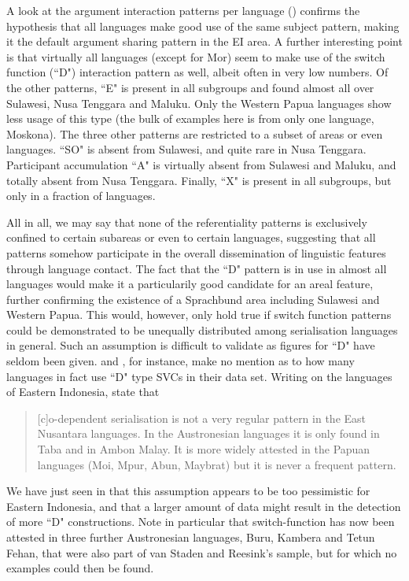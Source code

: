 A look at the argument interaction patterns per language () confirms the hypothesis that all languages make good use of the same subject pattern, making it the default argument sharing pattern in the EI area. A further interesting point is that virtually all languages (except for Mor) seem to make use of the switch function (``D") interaction pattern as well, albeit often in very low numbers. Of the other patterns, ``E" is present in all subgroups and found almost all over Sulawesi, Nusa Tenggara and Maluku. Only the Western Papua languages show less usage of this type (the bulk of examples here is from only one language, Moskona). The three other patterns are restricted to a subset of areas or even languages. ``SO" is absent from Sulawesi, and quite rare in Nusa Tenggara. Participant accumulation ``A" is virtually absent from Sulawesi and Maluku, and totally absent from Nusa Tenggara. Finally, ``X" is present in all subgroups, but only in a fraction of languages.

All in all, we may say that none of the referentiality patterns is exclusively confined to certain subareas or even to certain languages, suggesting that all patterns somehow participate in the overall dissemination of linguistic features through language contact. The fact that the ``D" pattern is in use in almost all languages would make it a particularily good candidate for an areal feature, further confirming the existence of a Sprachbund area including Sulawesi and Western Papua. This would, however, only hold true if switch function patterns could be demonstrated to be unequally distributed among serialisation languages in general. Such an assumption is difficult to validate as figures for ``D" have seldom been given. \textcite{Aikhenvald2006} and \textcite{Durie1997}, for instance, make no mention as to how many languages in fact use ``D" type SVCs in their data set. Writing on the languages of Eastern Indonesia, \citet[26]{vanstaden2008serial} state that \begin{quote}[c]o-dependent serialisation is not a very regular pattern in the East Nusantara languages. In the Austronesian languages it is only found in Taba and in Ambon Malay. It is more widely attested in the Papuan languages (Moi, Mpur, Abun, Maybrat) but it is never a frequent pattern.\end{quote}
We have just seen in  that this assumption appears to be too pessimistic for Eastern Indonesia, and that a larger amount of data might result in the detection of more ``D" constructions. Note in particular that switch-function has now been attested in three further Austronesian languages, Buru, Kambera and Tetun Fehan, that were also part of van Staden and Reesink's sample, but for which no examples could then be found.

